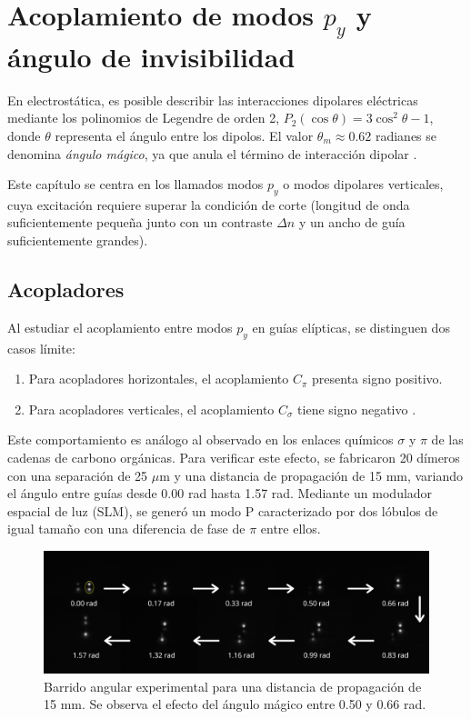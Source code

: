 \chapter{Acoplamiento de modos $p_y$ y ángulo de invisibilidad}

En electrostática, es posible describir las interacciones dipolares eléctricas mediante los polinomios de Legendre de orden 2, $P_2(\cos\theta) = 3\cos^2\theta - 1$, donde $\theta$ representa el ángulo entre los dipolos. El valor $\theta_m \approx 0.62$ radianes se denomina \textit{ángulo mágico}, ya que anula el término de interacción dipolar \citep{medmagic}.

Este capítulo se centra en los llamados modos $p_y$ o modos dipolares verticales, cuya excitación requiere superar la condición de corte (longitud de onda suficientemente pequeña junto con un contraste $\Delta n$ y un ancho de guía suficientemente grandes).

\section{Acopladores}

Al estudiar el acoplamiento entre modos $p_y$ en guías elípticas, se distinguen dos casos límite:
\begin{enumerate}
    \item Para acopladores horizontales, el acoplamiento $C_\pi$ presenta signo positivo.
    \item Para acopladores verticales, el acoplamiento $C_\sigma$ tiene signo negativo \cite{Pmodecoupling}.
\end{enumerate}

Este comportamiento es análogo al observado en los enlaces químicos $\sigma$ y $\pi$ de las cadenas de carbono orgánicas. Para verificar este efecto, se fabricaron 20 dímeros con una separación de 25 $\mu$m y una distancia de propagación de 15 mm, variando el ángulo entre guías desde 0.00 rad hasta 1.57 rad. Mediante un modulador espacial de luz (SLM), se generó un modo P caracterizado por dos lóbulos de igual tamaño con una diferencia de fase de $\pi$ entre ellos.

\begin{figure}[H]
    \centering
    \includegraphics[trim={0 2cm 0 4cm},clip, width=\linewidth]{media/26um_15mm_angles_v2.png}
    \caption[Barrido angular experimental]{Barrido angular experimental para una distancia de propagación de 15 mm. Se observa el efecto del ángulo mágico entre 0.50 y 0.66 rad. \label{fig:angulobarrido}}
\end{figure}

